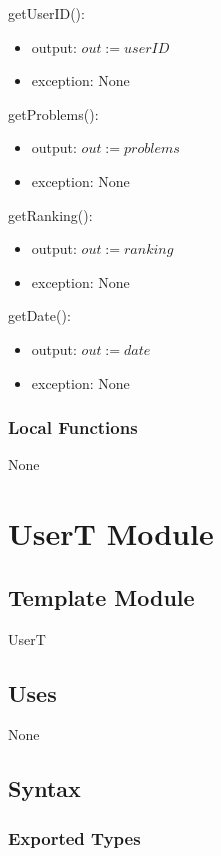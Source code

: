 \documentclass[12pt, titlepage]{article}
\begin{document}
\noindent getUserID():
\begin{itemize}
\item output: $out := userID$
\item exception: None
\end{itemize}

\noindent getProblems():
\begin{itemize}
\item output: $out := problems$
\item exception: None
\end{itemize}

\noindent getRanking():
\begin{itemize}
\item output: $out := ranking$
\item exception: None
\end{itemize}

\noindent getDate():
\begin{itemize}
\item output: $out := date$
\item exception: None
\end{itemize}
\subsubsection{Local Functions}

None

\newpage

\section{UserT Module}  \label{UserT}
\subsection{Template Module}
UserT
\subsection{Uses}

None

\subsection{Syntax}

\subsubsection{Exported Types}
\end{document}
